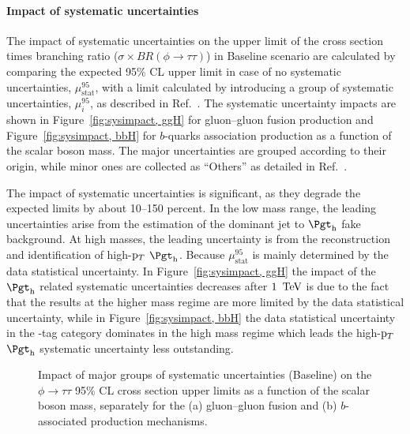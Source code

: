 \paragraph{Impact of systematic uncertainties}
The impact of systematic uncertainties on the upper limit of the cross section times branching ratio ($\sigma\times BR(\phi\to\tau\tau)$) in Baseline scenario are calculated by comparing the expected 95\% CL upper limit in case of no systematic uncertainties, $\mu^{95}_{\text{stat}}$, with a limit calculated by introducing a group of systematic uncertainties, $\mu^{95}_i$, as described in Ref.~\cite{ATLASRun2Ditau}. The systematic uncertainty impacts are shown in Figure~\ref{fig:sysimpact, ggH} for gluon--gluon fusion production and Figure~\ref{fig:sysimpact, bbH} for $b$-quarks association production as a function of the scalar boson mass. The major uncertainties are grouped according to their origin, while minor ones are collected as ``Others'' as detailed in Ref.~\cite{ATLASRun2Ditau}.

The impact of systematic uncertainties is significant, as they degrade the expected limits by about 10--150 percent. In the low mass range, the leading uncertainties arise from the estimation of the dominant jet to $\tauhad$ fake background. At high masses, the leading uncertainty is from the reconstruction and identification of high-$\mathrm{p}_{T}$ $\tauhad$. Because $\mu^{95}_{\text{stat}}$ is mainly determined by the data statistical uncertainty. In Figure~\ref{fig:sysimpact, ggH} the impact of the $\tauhad$ related systematic uncertainties decreases after $1~\,\text{Te\hspace{-.08em}V}$ is due to the fact that the results at the higher mass regime are more limited by the data statistical uncertainty, while in Figure~\ref{fig:sysimpact, bbH} the data statistical uncertainty in the \PQb-tag category dominates in the high mass regime which leads the high-$\mathrm{p}_{T}$ $\tauhad$ systematic uncertainty less outstanding.

\begin{figure}[!ht]
    \centering
        \qquad
        \caption{Impact of major groups of systematic uncertainties (Baseline) on the $\phi\to\tau\tau$ 95\% CL cross section upper limits as a function of the scalar boson mass, separately for the (a) gluon--gluon fusion and (b) $b$-associated production mechanisms.}
    \label{fig:sysimpact}
\end{figure}

